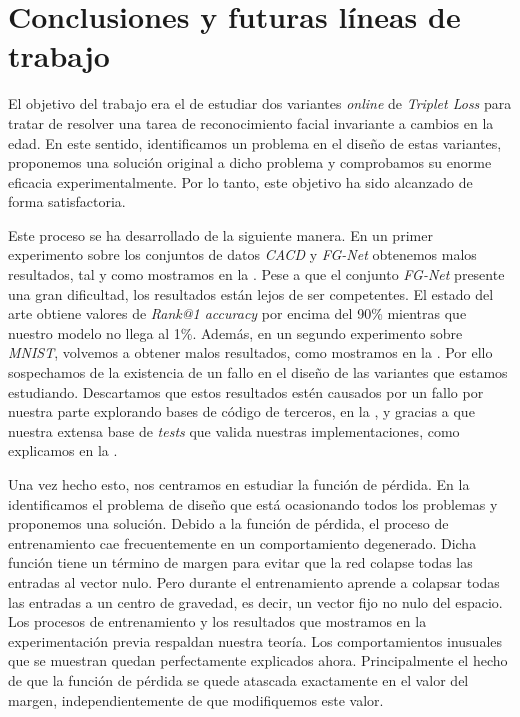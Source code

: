 \chapter{Conclusiones y futuras líneas de trabajo} \label{ich:conclusiones}

El objetivo del trabajo era el de estudiar dos variantes \textit{online} de \textit{Triplet Loss} para tratar de resolver una tarea de reconocimiento facial invariante a cambios en la edad. En este sentido, identificamos un problema en el diseño de estas variantes, proponemos una solución original a dicho problema y comprobamos su enorme eficacia experimentalmente. Por lo tanto, este objetivo ha sido alcanzado de forma satisfactoria.

Este proceso se ha desarrollado de la siguiente manera. En un primer experimento sobre los conjuntos de datos \textit{CACD} y \textit{FG-Net} obtenemos malos resultados, tal y como mostramos en la . Pese a que el conjunto \textit{FG-Net} presente una gran dificultad, los resultados están lejos de ser competentes. El estado del arte obtiene valores de \textit{Rank@1 accuracy} por encima del 90\% mientras que nuestro modelo no llega al 1\%. Además, en un segundo experimento sobre \textit{MNIST}, volvemos a obtener malos resultados, como mostramos en la . Por ello sospechamos de la existencia de un fallo en el diseño de las variantes que estamos estudiando. Descartamos que estos resultados estén causados por un fallo por nuestra parte explorando bases de código de terceros, en la , y gracias a que nuestra extensa base de \textit{tests} que valida nuestras implementaciones, como explicamos en la .

Una vez hecho esto, nos centramos en estudiar la función de pérdida. En la  identificamos el problema de diseño que está ocasionando todos los problemas y proponemos una solución. Debido a la función de pérdida, el proceso de entrenamiento cae frecuentemente en un comportamiento degenerado. Dicha función tiene un término de margen para evitar que la red colapse todas las entradas al vector nulo. Pero durante el entrenamiento aprende a colapsar todas las entradas a un centro de gravedad, es decir, un vector fijo no nulo del espacio. Los procesos de entrenamiento y los resultados que mostramos en la experimentación previa respaldan nuestra teoría. Los comportamientos inusuales que se muestran quedan perfectamente explicados ahora. Principalmente el hecho de que la función de pérdida se quede atascada exactamente en el valor del margen, independientemente de que modifiquemos este valor.

